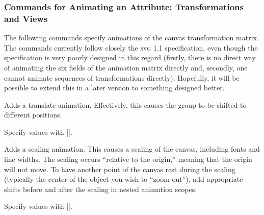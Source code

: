 \subsubsection{Commands for Animating an Attribute: Transformations  and Views}

The following commands specify animations of the canvas transformation
matrix. The commands currently follow closely the \textsc{svg 1.1}
specification, even though the specification is very poorly designed
in this regard (firstly, there is no direct way of animating the six
fields of the animation matrix directly and, secondly, one cannot
animate sequences of transformations directly). Hopefully, it will be
possible to extend this in a later version to something designed better.

\begin{command}{\pgfsys@animatetranslate}
  Adds a translate animation. Effectively, this causes the group to be
  shifted to different positions.
  
  Specify values with |\pgfsys@animation@translate|.
\begin{codeexample}[width=2cm]
\end{codeexample}
\end{command}

\begin{command}{\pgfsys@animatescale}
  Adds a scaling animation. This causes a scaling of the canvas,
  including fonts and line widths. The scaling occurs ``relative to the
  origin,'' meaning that the origin will not move. To have another
  point of the canvas rest during the scaling (typically the center of
  the object you wish to ``zoom out''), add appropriate shifts before
  and after the scaling in nested animation scopes.
  
  Specify values with |\pgfsys@animation@scale|.
\begin{codeexample}[width=2cm]
\end{codeexample}
\end{command}

